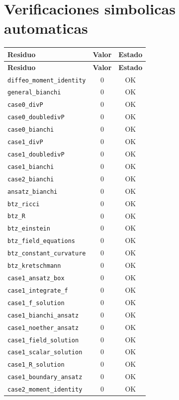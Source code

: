 \documentclass[11pt,a4paper]{article}
\begin{document}
\section{Verificaciones simbolicas automaticas}
\begin{longtable}{p{}cc}
\toprule
\textbf{Residuo} & \textbf{Valor} & \textbf{Estado}\\
\midrule
\endfirsthead
\toprule
\textbf{Residuo} & \textbf{Valor} & \textbf{Estado}\\
\midrule
\endhead
\texttt{diffeo\_moment\_identity} & $0$ & OK\\
\texttt{general\_bianchi} & $0$ & OK\\
\texttt{case0\_divP} & $0$ & OK\\
\texttt{case0\_doubledivP} & $0$ & OK\\
\texttt{case0\_bianchi} & $0$ & OK\\
\texttt{case1\_divP} & $0$ & OK\\
\texttt{case1\_doubledivP} & $0$ & OK\\
\texttt{case1\_bianchi} & $0$ & OK\\
\texttt{case2\_bianchi} & $0$ & OK\\
\texttt{ansatz\_bianchi} & $0$ & OK\\
\texttt{btz\_ricci} & $0$ & OK\\
\texttt{btz\_R} & $0$ & OK\\
\texttt{btz\_einstein} & $0$ & OK\\
\texttt{btz\_field\_equations} & $0$ & OK\\
\texttt{btz\_constant\_curvature} & $0$ & OK\\
\texttt{btz\_kretschmann} & $0$ & OK\\
\texttt{case1\_ansatz\_box} & $0$ & OK\\
\texttt{case1\_integrate\_f} & $0$ & OK\\
\texttt{case1\_f\_solution} & $0$ & OK\\
\texttt{case1\_bianchi\_ansatz} & $0$ & OK\\
\texttt{case1\_noether\_ansatz} & $0$ & OK\\
\texttt{case1\_field\_solution} & $0$ & OK\\
\texttt{case1\_scalar\_solution} & $0$ & OK\\
\texttt{case1\_R\_solution} & $0$ & OK\\
\texttt{case1\_boundary\_ansatz} & $0$ & OK\\
\texttt{case2\_moment\_identity} & $0$ & OK\\

\end{longtable}
\end{document}
